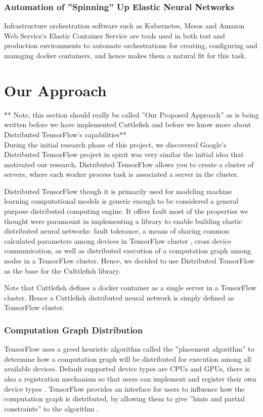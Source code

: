 \documentclass[conference]{IEEEtran}
\begin{document}
\subsubsection{Automation of ''Spinning'' Up Elastic Neural Networks}
Infrastructure orchestration software such as Kubernetes, Mesos and Amazon Web Service's Elastic Container Service are tools used in both test and production environments to automate orchestrations for creating, configuring and managing docker containers, and hence makes them a natural fit for this task.

\section{Our Approach}

** Note, this section should really be called ''Our Proposed Approach'' as is being written before we have implemented Cuttlefish and before we know more about Distributed TensorFlow's capabilities**\\

During the initial research phase of this project, we discovered Google's Distributed TensorFlow project in spirit was very similar the initial idea that motivated our research.  Distributed TensorFlow allows you to create a cluster of servers, where each worker process task is associated a server in the cluster.

Distributed TensorFlow though it is primarily used for modeling machine learning computational models is generic enough to be considered a general purpose distributed computing engine. It offers fault most of the properties we thought were paramount in implementing a library to enable building elastic distributed neural networks: fault  tolerance, a means of sharing common calculated parameters among devices in TensorFlow cluster \cite{dist-tensorflow}, cross device communication, as well as distributed execution of a computation graph among nodes in a TensorFlow cluster.  Hence, we decided to use Distributed TensorFlow as the base for the Culttlefish library.

Note that Cuttlefish defines a docker container as a single server in a TensorFlow cluster. Hence a Cuttlefish distributed neural network is simply defined as TensorFlow cluster.

\subsubsection{Computation Graph Distribution}
TensorFlow uses a greed heuristic algorithm called the ''placement algorithm'' \cite{tensor-flow-white} to determine how a computation graph will be distributed for execution among all available devices. Default supported device types are CPUs and GPUs, there is  also a registration mechanism so that users can implement and register their own device types \cite{tensor-flow-white}. TensorFlow provides an interface for users to influence how the computation graph is distributed, by allowing them to give ''hints and partial constraints'' to the algorithm \cite{tensor-flow-white}. 
\end{document}
